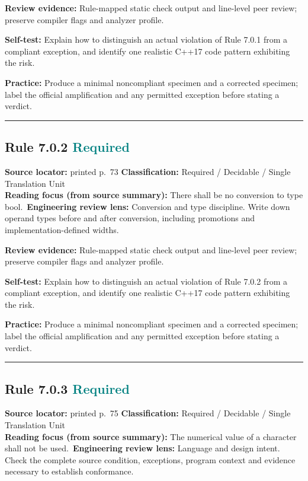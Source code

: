 \documentclass[10pt,letterpaper]{article}
\begin{document}
\textbf{Review evidence:} Rule-mapped static check output and line-level peer review; preserve compiler flags and analyzer profile.

\textbf{Self-test:} Explain how to distinguish an actual violation of Rule 7.0.1 from a compliant exception, and identify one realistic C++17 code pattern exhibiting the risk.\par
\textbf{Practice:} Produce a minimal noncompliant specimen and a corrected specimen; label the official amplification and any permitted exception before stating a verdict.
\smallskip\hrule\smallskip
\subsection*{Rule 7.0.2 \enspace \texorpdfstring{\small\textcolor{teal}{Required}}{Required}}
\noindent\textbf{Source locator:} printed p.~73 \quad\textbf{Classification:} Required / Decidable / Single Translation Unit\\
\textbf{Reading focus (from source summary):} There shall be no conversion to type bool.\
\textbf{Engineering review lens:} Conversion and type discipline. Write down operand types before and after conversion, including promotions and implementation-defined widths.

\textbf{Review evidence:} Rule-mapped static check output and line-level peer review; preserve compiler flags and analyzer profile.

\textbf{Self-test:} Explain how to distinguish an actual violation of Rule 7.0.2 from a compliant exception, and identify one realistic C++17 code pattern exhibiting the risk.\par
\textbf{Practice:} Produce a minimal noncompliant specimen and a corrected specimen; label the official amplification and any permitted exception before stating a verdict.
\smallskip\hrule\smallskip
\subsection*{Rule 7.0.3 \enspace \texorpdfstring{\small\textcolor{teal}{Required}}{Required}}
\noindent\textbf{Source locator:} printed p.~75 \quad\textbf{Classification:} Required / Decidable / Single Translation Unit\\
\textbf{Reading focus (from source summary):} The numerical value of a character shall not be used.\
\textbf{Engineering review lens:} Language and design intent. Check the complete source condition, exceptions, program context and evidence necessary to establish conformance.
\end{document}
